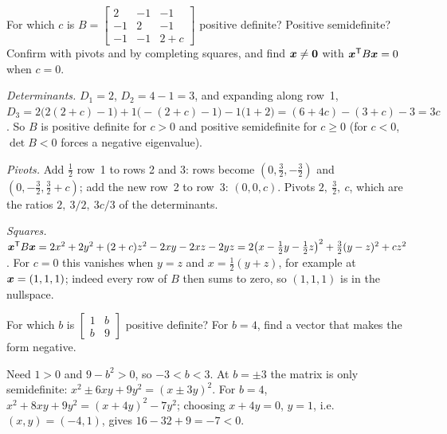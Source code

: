 \begin{exercise}\label{exr:u31-param}
For which $c$ is $B=\left[\begin{smallmatrix}2&-1&-1\\-1&2&-1\\-1&-1&2+c\end{smallmatrix}\right]$ positive
definite? Positive semidefinite? Confirm with pivots and by completing squares, and find
$\boldsymbol{x}\ne\boldsymbol{0}$ with $\boldsymbol{x}^{\mathsf{T}} B\boldsymbol{x}=0$ when $c=0$.
\end{exercise}
\begin{solution}
\emph{Determinants.} $D_1=2$, $D_2=4-1=3$, and expanding along row~1,
$D_3=2\bigl(2(2+c)-1\bigr)+1\bigl(-(2+c)-1\bigr)-1\bigl(1+2\bigr)=(6+4c)-(3+c)-3=3c$. So $B$ is
positive definite for $c>0$ and positive semidefinite for $c\ge0$ (for $c<0$, $\det B<0$ forces a
negative eigenvalue).

\emph{Pivots.} Add $\tfrac12$ row~1 to rows 2 and 3: rows become $(0,\tfrac32,-\tfrac32)$ and
$(0,-\tfrac32,\tfrac32+c)$; add the new row~2 to row~3: $(0,0,c)$. Pivots $2,\ \tfrac32,\ c$, which are
the ratios $2,\ 3/2,\ 3c/3$ of the determinants.

\emph{Squares.} $\boldsymbol{x}^{\mathsf{T}} B\boldsymbol{x}=2x^2+2y^2+(2+c)z^2-2xy-2xz-2yz
=2\bigl(x-\tfrac12y-\tfrac12z\bigr)^2+\tfrac32(y-z)^2+cz^2$. For $c=0$ this vanishes when $y=z$ and
$x=\tfrac12(y+z)$, for example at $\boldsymbol{x}=(1,1,1)$; indeed every row of $B$ then sums to zero, so
$(1,1,1)$ is in the nullspace.
\end{solution}

\begin{exercise}\label{exr:u31-b}
For which $b$ is $\left[\begin{smallmatrix}1&b\\b&9\end{smallmatrix}\right]$ positive definite? For
$b=4$, find a vector that makes the form negative.
\end{exercise}
\begin{solution}
Need $1>0$ and $9-b^2>0$, so $-3<b<3$. At $b=\pm3$ the matrix is only semidefinite:
$x^2\pm6xy+9y^2=(x\pm3y)^2$. For $b=4$, $x^2+8xy+9y^2=(x+4y)^2-7y^2$; choosing $x+4y=0$, $y=1$,
i.e.\ $(x,y)=(-4,1)$, gives $16-32+9=-7<0$.
\end{solution}
